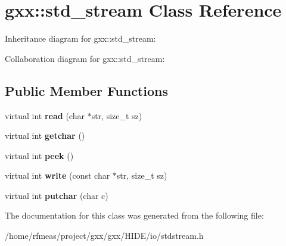 \hypertarget{classgxx_1_1std__stream}{}\section{gxx\+:\+:std\+\_\+stream Class Reference}
\label{classgxx_1_1std__stream}


Inheritance diagram for gxx\+:\+:std\+\_\+stream\+:


Collaboration diagram for gxx\+:\+:std\+\_\+stream\+:
\subsection*{Public Member Functions}
\begin{DoxyCompactItemize}
\item 
virtual int {\bfseries read} (char $\ast$str, size\+\_\+t sz)\hypertarget{classgxx_1_1std__stream_a8a0e8f482a9701d2718b830809a35fc5}{}\label{classgxx_1_1std__stream_a8a0e8f482a9701d2718b830809a35fc5}

\item 
virtual int {\bfseries getchar} ()\hypertarget{classgxx_1_1std__stream_ab267966d1545b1bc70f1ea80d3f5e857}{}\label{classgxx_1_1std__stream_ab267966d1545b1bc70f1ea80d3f5e857}

\item 
virtual int {\bfseries peek} ()\hypertarget{classgxx_1_1std__stream_aef5c2245c4d1cbd593d16037102888ea}{}\label{classgxx_1_1std__stream_aef5c2245c4d1cbd593d16037102888ea}

\item 
virtual int {\bfseries write} (const char $\ast$str, size\+\_\+t sz)\hypertarget{classgxx_1_1std__stream_a52292fabcf42ddec09a81db53f866f6b}{}\label{classgxx_1_1std__stream_a52292fabcf42ddec09a81db53f866f6b}

\item 
virtual int {\bfseries putchar} (char c)\hypertarget{classgxx_1_1std__stream_ac2bf5bfbb43828258fc1bc3ef1676720}{}\label{classgxx_1_1std__stream_ac2bf5bfbb43828258fc1bc3ef1676720}

\end{DoxyCompactItemize}


The documentation for this class was generated from the following file\+:\begin{DoxyCompactItemize}
\item 
/home/rfmeas/project/gxx/gxx/\+H\+I\+D\+E/io/stdstream.\+h\end{DoxyCompactItemize}
